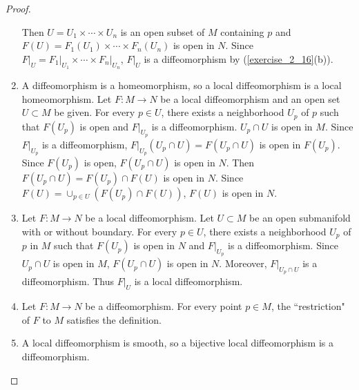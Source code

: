 \begin{proof}
\begin{enumerate}[label=(\alph*)]
      Then $U = U_1 \times \cdots \times U_n$ is an open subset of $M$ containing $p$ and $F(U) = F_1(U_1) \times \cdots \times F_n(U_n)$ is open in $N$.
      Since $F\vert_U = F_1\vert_{U_1} \times \cdots \times F_n\vert_{U_n}$, $F\vert_U$ is a diffeomorphism by (\ref{exercise_2_16}(b)).
    \item
      A diffeomorphism is a homeomorphism, so a local diffeomorphism is a local homeomorphism.
      Let $F: M \rightarrow N$ be a local diffeomorphism and an open set $U \subset M$ be given.
      For every $p \in U$, there exists a neighborhood $U_p$ of $p$ such that $F(U_p)$ is open and $F\vert_{U_p}$ is a diffeomorphism.
      $U_p \cap U$ is open in $M$.
      Since $F\vert_{U_p}$ is a diffeomorphism, $F\vert_{U_p}(U_p \cap U) = F(U_p \cap U)$ is open in $F(U_p)$.
      Since $F(U_p)$ is open, $F(U_p \cap U)$ is open in $N$.
      Then $F(U_p \cap U) = F(U_p) \cap F(U)$ is open in $N$.
      Since $F(U) = \cup_{p \in U} (F(U_p) \cap F(U))$, $F(U)$ is open in $N$.
    \item
      Let $F:M \rightarrow N$ be a local diffeomorphism.
      Let $U \subset M$ be an open submanifold with or without boundary.
      For every $p \in U$, there exists a neighborhood $U_p$ of $p$ in $M$ such that $F(U_p)$ is open in $N$ and $F\vert_{U_p}$ is a diffeomorphism.
      Since $U_p \cap U$ is open in $M$, $F(U_p \cap U)$ is open in $N$.
      Moreover, $F\vert_{U_p \cap U}$ is a diffeomorphism.
      Thus $F\vert_{U}$ is a local diffeomorphism.
    \item
      Let $F:M \rightarrow N$ be a diffeomorphism.
      For every point $p \in M$, the ``restriction" of $F$ to $M$ satisfies the definition.
    \item
      A local diffeomorphism is smooth, so a bijective local diffeomorphism is a diffeomorphism.
  \end{enumerate}
\end{proof}
